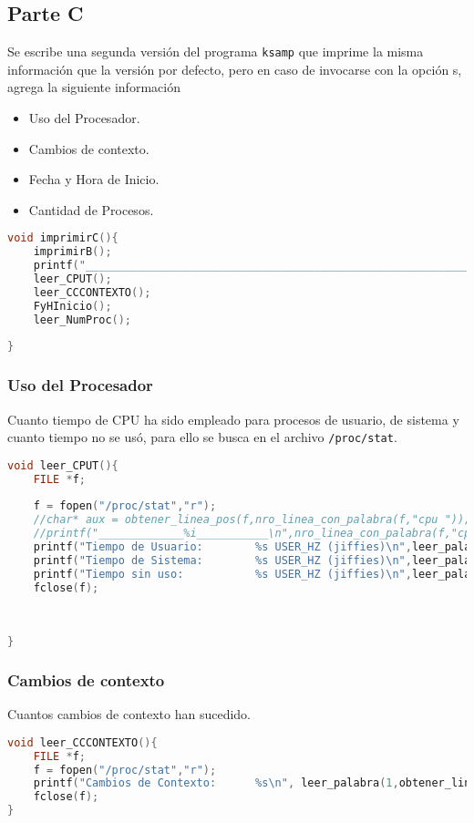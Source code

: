 \documentclass{article}
\begin{document}
\subsection{Parte C}
Se escribe una segunda versión del programa \verb+ksamp+ que imprime la misma información que la versión por defecto, pero en caso de invocarse con la opción \-s, agrega la siguiente información
\begin{itemize}
\item Uso del Procesador.
\item Cambios de contexto.
\item Fecha y Hora de Inicio.
\item Cantidad de Procesos.
\end{itemize}

{\fontfamily{\ttdefault}\selectfont
\begin{lstlisting}[language=c,caption=Función imprimirC()., breaklines=true] 
void imprimirC(){
	imprimirB();
	printf("____________________________________________________________\n");
	leer_CPUT();
	leer_CCCONTEXTO();
	FyHInicio();
	leer_NumProc();
	
}
\end{lstlisting}}

\subsubsection*{Uso del Procesador}
Cuanto tiempo de CPU ha sido empleado para procesos de usuario, de sistema y cuanto tiempo no se usó, para ello se busca en el archivo \verb+/proc/stat+.
{\fontfamily{\ttdefault}\selectfont
\begin{lstlisting}[language=c,caption=Función leer\_CPUT()., breaklines=true] 
void leer_CPUT(){
	FILE *f;
	
	f = fopen("/proc/stat","r");
	//char* aux = obtener_linea_pos(f,nro_linea_con_palabra(f,"cpu "));
	//printf("_____________%i___________\n",nro_linea_con_palabra(f,"cpu"));
	printf("Tiempo de Usuario:        %s USER_HZ (jiffies)\n",leer_palabra(1,obtener_linea_pos(f,nro_linea_con_palabra(f,"cpu"))));
	printf("Tiempo de Sistema:        %s USER_HZ (jiffies)\n",leer_palabra(3,obtener_linea_pos(f,nro_linea_con_palabra(f,"cpu"))));
	printf("Tiempo sin uso:           %s USER_HZ (jiffies)\n",leer_palabra(4,obtener_linea_pos(f,nro_linea_con_palabra(f,"cpu"))));
	fclose(f);
	
	
	
}
\end{lstlisting}}
\subsubsection*{Cambios de contexto}
Cuantos cambios de contexto han sucedido.
{\fontfamily{\ttdefault}\selectfont
\begin{lstlisting}[language=c,caption=Función leer\_CCCONTEXTO()., breaklines=true] 
void leer_CCCONTEXTO(){
	FILE *f;
	f = fopen("/proc/stat","r");
	printf("Cambios de Contexto:      %s\n", leer_palabra(1,obtener_linea_pos(f,nro_linea_con_palabra(f,"ctxt"))));
	fclose(f);
}
\end{lstlisting}}
\end{document}
